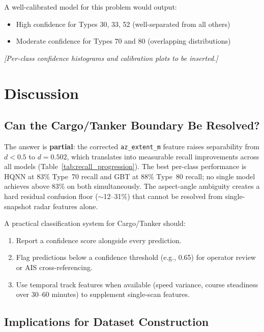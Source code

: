 \documentclass[journal]{IEEEtran}
\begin{document}
A well-calibrated model for this problem would output:
\begin{itemize}
  \item High confidence for Types 30, 33, 52 (well-separated from all others)
  \item Moderate confidence for Types 70 and 80 (overlapping distributions)
\end{itemize}

\textit{[Per-class confidence histograms and calibration plots to be inserted.]}

\section{Discussion}
\label{sec:discussion}

\subsection{Can the Cargo/Tanker Boundary Be Resolved?}

The answer is \textbf{partial}: the corrected \texttt{az\_extent\_m} feature
raises separability from $d < 0.5$ to $d = 0.502$, which translates into
measurable recall improvements across all models (Table~\ref{tab:recall_progression}).
The best per-class performance is HQNN at 83\% Type~70 recall and GBT at 88\%
Type~80 recall; no single model achieves above 83\% on both simultaneously.
The aspect-angle ambiguity creates a hard residual confusion floor
($\sim$12--31\%) that cannot be resolved from single-snapshot radar features alone.

A practical classification system for Cargo/Tanker should:
\begin{enumerate}
  \item Report a confidence score alongside every prediction.
  \item Flag predictions below a confidence threshold (e.g., 0.65) for
        operator review or AIS cross-referencing.
  \item Use temporal track features when available (speed variance, course
        steadiness over 30--60 minutes) to supplement single-scan features.
\end{enumerate}

\subsection{Implications for Dataset Construction}
\end{document}
